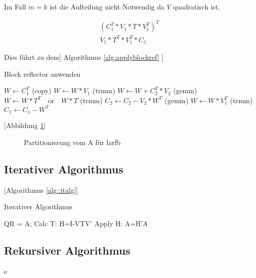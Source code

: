 Im Fall $ m = k $ ist die Aufteilung nicht Notwendig da $ V $ quadratisch ist.

\begin{align*}
	(C_1^T * V_1 * T *V_1^T)^T\\
	V_1 * T^T * V_1^T * C_1
\end{align*}



Dies führt zu dem[ Algorithmus \ref{alg:applyblockref} ]\\
\begin{algorithm}
	\caption{Block reflector anwenden}
	\label{alg:applyblockref}
	\begin{algorithmic}
		\State 	$W \leftarrow C_1^T$ (copy)
		\State	$W \leftarrow W * V_1 $ (trmm)
			\State $W \leftarrow W + C_2^T*V_2$ (gemm)
		\EndIf
		\State 	$ W \leftarrow W * T^T \quad \text{or}\quad  W * T$ (trmm)
			\State $C_2 \leftarrow C_2 - V_2 * W^T$ (gemm)
		\EndIf
		\State 	$ W \leftarrow W * V_1^T $ (trmm)
		\State 	$ C_1 \leftarrow C_1 - W^T $
	\end{algorithmic}
\end{algorithm}


[Abbildung \ref{fig:patrA}]
\begin{figure} 
	\centering
	
	\caption{Partitionierung vom A für larfb}
	\label{fig:patrA}
\end{figure}


\subsection{Iterativer Algorithmus}
[Algorithmus \ref{alg::italg}]
\begin{algorithm}
	\caption{Iterativer Algorithmus}
	\label{alg::italg}
	\begin{algorithmic}
		\For {i = 0 : n}
			\State QR = A;
			\If {i + ib > n}
				\State Calc T: H=I-VTV'
				\State Apply H: A=H'A
			\EndIf
		\EndFor
	\end{algorithmic}
\end{algorithm}


\subsection{Rekursiver Algorithmus}


e
